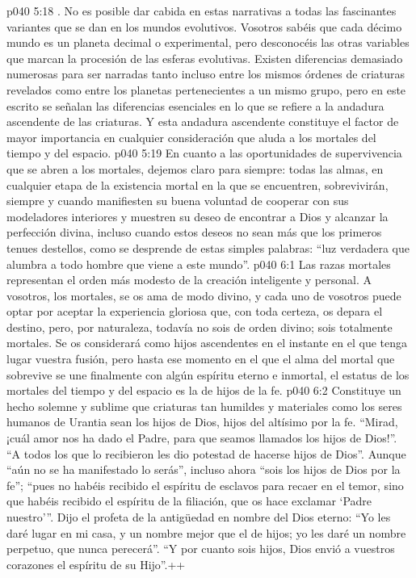\vs p040 5:18 \pc {}. No es posible dar cabida en estas narrativas a todas las fascinantes variantes que se dan en los mundos evolutivos. Vosotros sabéis que cada décimo mundo es un planeta decimal o experimental, pero desconocéis las otras variables que marcan la procesión de las esferas evolutivas. Existen diferencias demasiado numerosas para ser narradas tanto incluso entre los mismos órdenes de criaturas revelados como entre los planetas pertenecientes a un mismo grupo, pero en este escrito se señalan las diferencias esenciales en lo que se refiere a la andadura ascendente de las criaturas. Y esta andadura ascendente constituye el factor de mayor importancia en cualquier consideración que aluda a los mortales del tiempo y del espacio.
\vs p040 5:19 \pc En cuanto a las oportunidades de supervivencia que se abren a los mortales, dejemos claro para siempre: todas las almas, en cualquier etapa de la existencia mortal en la que se encuentren, sobrevivirán, siempre y cuando manifiesten su buena voluntad de cooperar con sus modeladores interiores y muestren su deseo de encontrar a Dios y alcanzar la perfección divina, incluso cuando estos deseos no sean más que los primeros tenues destellos, como se desprende de estas simples palabras: “luz verdadera que alumbra a todo hombre que viene a este mundo”.
\vs p040 6:1 Las razas mortales representan el orden más modesto de la creación inteligente y personal. A vosotros, los mortales, se os ama de modo divino, y cada uno de vosotros puede optar por aceptar la experiencia gloriosa que, con toda certeza, os depara el destino, pero, por naturaleza, todavía no sois de orden divino; sois totalmente mortales. Se os considerará como hijos ascendentes en el instante en el que tenga lugar vuestra fusión, pero hasta ese momento en el que el alma del mortal que sobrevive se une finalmente con algún espíritu eterno e inmortal, el estatus de los mortales del tiempo y del espacio es la de hijos de la fe.
\vs p040 6:2 Constituye un hecho solemne y sublime que criaturas tan humildes y materiales como los seres humanos de Urantia sean los hijos de Dios, hijos del altísimo por la fe. “Mirad, ¡cuál amor nos ha dado el Padre, para que seamos llamados los hijos de Dios!”. “A todos los que lo recibieron les dio potestad de hacerse hijos de Dios”. Aunque “aún no se ha manifestado lo serás”, incluso ahora “sois los hijos de Dios por la fe”; “pues no habéis recibido el espíritu de esclavos para recaer en el temor, sino que habéis recibido el espíritu de la filiación, que os hace exclamar ‘Padre nuestro’”. Dijo el profeta de la antigüedad en nombre del Dios eterno: “Yo les daré lugar en mi casa, y un nombre mejor que el de hijos; yo les daré un nombre perpetuo, que nunca perecerá”. “Y por cuanto sois hijos, Dios envió a vuestros corazones el espíritu de su Hijo”.++
